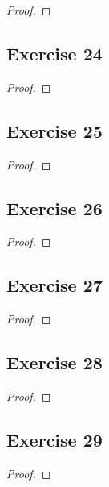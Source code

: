 \documentclass[14pt]{extarticle}
\begin{document}
\begin{proof}

\end{proof}

\subsection{Exercise 24}

\begin{proof}

\end{proof}

\subsection{Exercise 25}

\begin{proof}

\end{proof}

\subsection{Exercise 26}

\begin{proof}

\end{proof}

\subsection{Exercise 27}

\begin{proof}

\end{proof}

\subsection{Exercise 28}

\begin{proof}

\end{proof}

\subsection{Exercise 29}

\begin{proof}

\end{proof}
\end{document}
